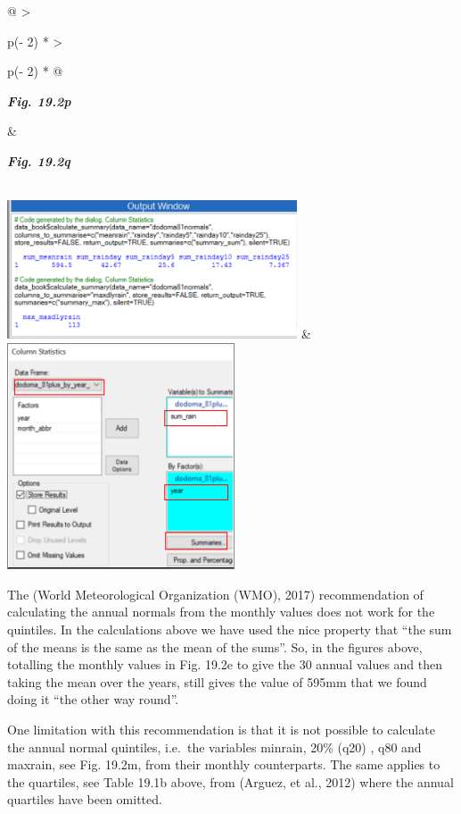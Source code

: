 \documentclass[
  letterpaper,
  DIV=11,
  numbers=noendperiod]{scrreprt}
\begin{document}
\begin{longtable}[]{@{}
  >{\raggedright\arraybackslash}p{(\columnwidth - 2\tabcolsep) * }
  >{\raggedright\arraybackslash}p{(\columnwidth - 2\tabcolsep) * }@{}}
\toprule\noalign{}
\begin{minipage}[b]{\linewidth}\raggedright
\textbf{\emph{Fig. 19.2p}}
\end{minipage} & \begin{minipage}[b]{\linewidth}\raggedright
\textbf{\emph{Fig. 19.2q}}
\end{minipage} \\
\midrule\noalign{}
\endhead
\bottomrule\noalign{}
\endlastfoot
\includegraphics[width=3.38801in,height=1.6163in]{figures/Fig19.2p.png}
&
\includegraphics[width=2.65829in,height=2.63924in]{figures/Fig19.2q.png} \\
\end{longtable}

The (World Meteorological Organization (WMO), 2017) recommendation of
calculating the annual normals from the monthly values does not work for
the quintiles. In the calculations above we have used the nice property
that ``the sum of the means is the same as the mean of the sums''. So,
in the figures above, totalling the monthly values in Fig. 19.2e to give
the 30 annual values and then taking the mean over the years, still
gives the value of 595mm that we found doing it ``the other way round''.

One limitation with this recommendation is that it is not possible to
calculate the annual normal quintiles, i.e.~the variables minrain, 20\%
(q20) , q80 and maxrain, see Fig. 19.2m, from their monthly
counterparts. The same applies to the quartiles, see Table 19.1b above,
from (Arguez, et al., 2012) where the annual quartiles have been
omitted.
\end{document}
